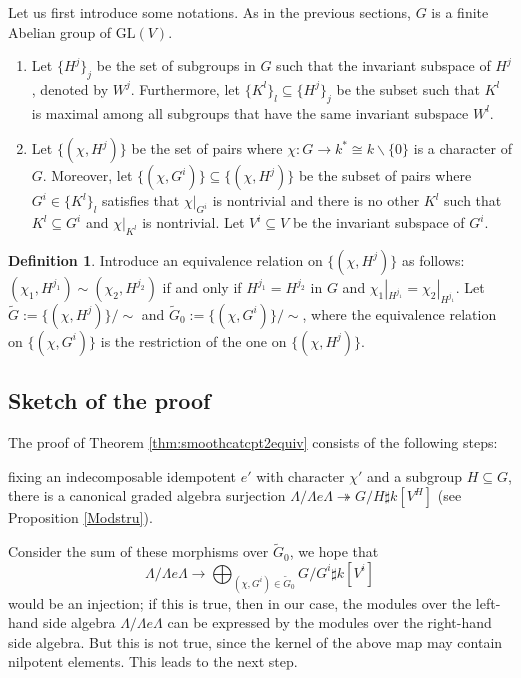 \documentclass[11pt,reqno]{amsart}
\theoremstyle{definition}
\newtheorem{definition}[theorem]{Definition}
\begin{document}
Let us first introduce some notations.
As in the previous sections, $G$ is a finite Abelian group
of $\mathrm{GL}(V)$.
\begin{enumerate}
\item[$-$]
Let $\{ H^j \}_j$ be the set of subgroups in $G$ such that the invariant subspace of $H^j$, denoted by $W^j$. 
Furthermore, 
let $\{ K^l \}_l \subseteq \{ H^j \}_j$ be the subset
such that $K^l$ is
maximal among all subgroups that
have the same invariant subspace $W^l$. 

\item[$-$]
Let $\{(\chi, H^j) \}$ be the
set of pairs where $\chi: G \rightarrow k^{\ast} \cong k\backslash \{0\}$ 
is a character of $G$. 
Moreover,
let $\{(\chi, G^i) \} \subseteq \{(\chi, H^j) \}$ be the subset of pairs where
$G^i \in\{ K^l \}_l$ satisfies that $\chi|_{G^i}$ is nontrivial and
there is no other $K^l$ such that
$K^l \subseteq G^i$ and $\chi|_{K^l}$ is nontrivial.
Let $V^i \subseteq V$ be the invariant subspace of $G^i$. 
\end{enumerate}


\begin{definition}
\label{def:equiv}
Introduce an equivalence relation on 
$\{(\chi, H^j) \}$
as follows:
$(\chi_1, H^{j_1}) \sim (\chi_2, H^{j_2})$ if
and only if $H^{j_1} = H^{j_2}$ in $G$ and
$\chi_1|_{H^{j_1}} = \chi_2|_{H^{j_1}}$. 
Let $\tilde{G} := \{ (\chi, H^j) \} / \sim$ and
$\tilde{G}_0 := \{ (\chi, G^i) \} / \sim$,
where the equivalence relation on
$\{(\chi, G^i)\}$ is the restriction of the
one on $\{(\chi, H^j)\}$.
\end{definition}


\subsection{Sketch of the proof}\label{subsect:strategy} 

The proof of Theorem
\ref{thm:smoothcatcpt2equiv}
consists of the following steps:

\vspace{2mm}

fixing an indecomposable idempotent $e'$ with character $\chi'$ 
and a subgroup $H \subseteq G$, there is 
a canonical 
graded algebra surjection 
$\Lambda/ \Lambda e \Lambda \twoheadrightarrow G/H \sharp k[V^{H}]$ (see Proposition \ref{Modstru}).

Consider the sum of these morphisms over
$\tilde G_0$,
we hope that 
$$\Lambda/\Lambda e\Lambda\to 
\bigoplus_{(\chi, G^i) \in \tilde{G}_0}  G/G^i \sharp k[V^i]
$$
would be an injection; if this is true,
then in our case, the modules
over the left-hand side algebra
$\Lambda/\Lambda e\Lambda$
can be expressed by the modules
over the right-hand side algebra.
But this is not true, since
the kernel of the above map
may contain nilpotent elements. This leads
to the next step.
\end{document}
